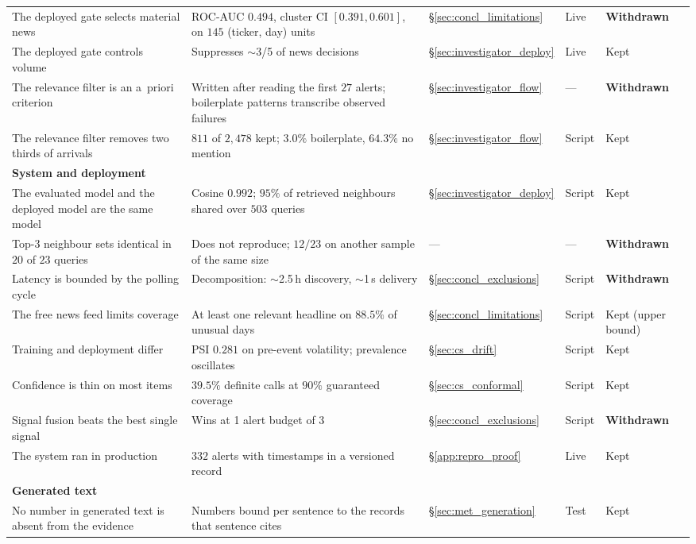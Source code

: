 \begin{table}[ht]
\begin{tabular}{p{4.6cm} p{3.5cm} p{1.6cm} p{1.2cm} p{1.7cm}}
The deployed gate selects material news & ROC-AUC $0.494$, cluster CI $[0.391, 0.601]$, on $145$ (ticker, day) units & §\ref{sec:concl_limitations} & Live & \textbf{Withdrawn} \\
The deployed gate controls volume & Suppresses $\sim$3/5 of news decisions & §\ref{sec:investigator_deploy} & Live & Kept \\
\midrule
The relevance filter is an a~priori criterion & Written after reading the first $27$ alerts; boilerplate patterns transcribe observed failures & §\ref{sec:investigator_flow} & --- & \textbf{Withdrawn} \\
The relevance filter removes two thirds of arrivals & $811$ of $2{,}478$ kept; $3.0\%$ boilerplate, $64.3\%$ no mention & §\ref{sec:investigator_flow} & Script & Kept \\
\midrule
\multicolumn{5}{l}{\textbf{System and deployment}} \\
The evaluated model and the deployed model are the same model & Cosine $0.992$; $95\%$ of retrieved neighbours shared over $503$ queries & §\ref{sec:investigator_deploy} & Script & Kept \\
Top-3 neighbour sets identical in $20$ of $23$ queries & Does not reproduce; $12/23$ on another sample of the same size & --- & --- & \textbf{Withdrawn} \\
Latency is bounded by the polling cycle & Decomposition: $\sim$2.5\,h discovery, $\sim$1\,s delivery & §\ref{sec:concl_exclusions} & Script & \textbf{Withdrawn} \\
The free news feed limits coverage & At least one relevant headline on $88.5\%$ of unusual days & §\ref{sec:concl_limitations} & Script & Kept (upper bound) \\
Training and deployment differ & PSI $0.281$ on pre-event volatility; prevalence oscillates & §\ref{sec:cs_drift} & Script & Kept \\
Confidence is thin on most items & $39.5\%$ definite calls at $90\%$ guaranteed coverage & §\ref{sec:cs_conformal} & Script & Kept \\
Signal fusion beats the best single signal & Wins at 1 alert budget of 3 & §\ref{sec:concl_exclusions} & Script & \textbf{Withdrawn} \\
The system ran in production & $332$ alerts with timestamps in a versioned record & §\ref{app:repro_proof} & Live & Kept \\
\midrule
\multicolumn{5}{l}{\textbf{Generated text}} \\
No number in generated text is absent from the evidence & Numbers bound per sentence to the records that sentence cites & §\ref{sec:met_generation} & Test & Kept \\

\end{tabular}
\end{table}
